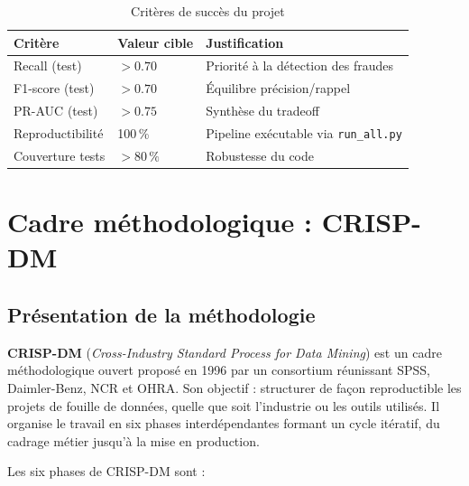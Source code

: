 \documentclass[12pt,a4paper,twoside]{report}
\begin{document}
\begin{table}[H]
\centering
\begin{tabular}{lll}
\toprule
\textbf{Critère} & \textbf{Valeur cible} & \textbf{Justification} \\
\midrule
Recall (test)    & $> 0.70$ & Priorité à la détection des fraudes \\
F1-score (test)  & $> 0.70$ & Équilibre précision/rappel \\
PR-AUC (test)    & $> 0.75$ & Synthèse du tradeoff \\
Reproductibilité & 100\,\%  & Pipeline exécutable via \texttt{run\_all.py} \\
Couverture tests & $> 80\,\%$ & Robustesse du code \\
\bottomrule
\end{tabular}
\caption{Critères de succès du projet}
\label{tab:criteres_succes}
\end{table}

\section{Cadre méthodologique : CRISP-DM}

\subsection{Présentation de la méthodologie}

\begin{definitionbox}
\textbf{CRISP-DM} (\textit{Cross-Industry Standard Process for Data Mining}) est un cadre méthodologique ouvert proposé en 1996 par un consortium réunissant SPSS, Daimler-Benz, NCR et OHRA. Son objectif : structurer de façon reproductible les projets de fouille de données, quelle que soit l'industrie ou les outils utilisés. Il organise le travail en six phases interdépendantes formant un cycle itératif, du cadrage métier jusqu'à la mise en production.
\end{definitionbox}

Les six phases de CRISP-DM sont :
\end{document}
